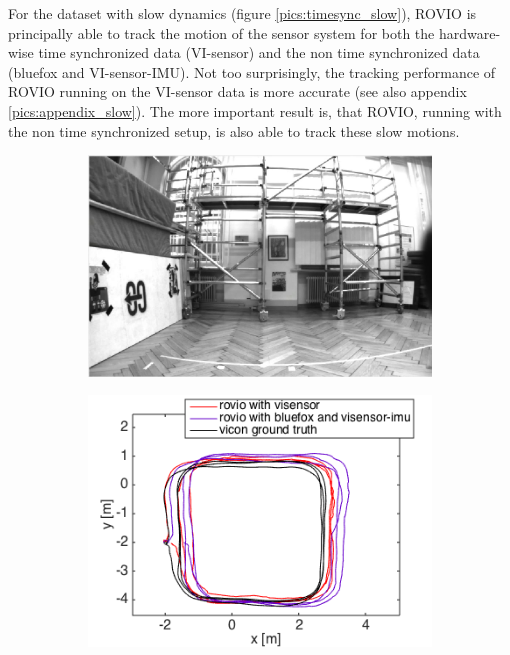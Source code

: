 For the dataset with slow dynamics (figure \ref{pics:timesync_slow}), ROVIO is principally able to track the motion of the sensor system for both the hardware-wise time synchronized data (VI-sensor) and the non time synchronized data (bluefox and VI-sensor-IMU). Not too surprisingly, the tracking performance of ROVIO running on the VI-sensor data is more accurate (see also appendix \ref{pics:appendix_slow}). The more important result is, that ROVIO, running with the non time synchronized setup, is also able to track these slow motions. \\

\begin{figure}
  \begin{subfigure}[b]{0.46\textwidth}
    \captionsetup{skip=6pt}
    \includegraphics[width=\textwidth]{images/slow.png}
    \caption{}
  \end{subfigure}
  \hfill
  \begin{subfigure}[b]{0.42\textwidth}
    \captionsetup{skip=6pt}
    \includegraphics[width=\textwidth]{images/slow_2D.png}

\end{subfigure}
\end{figure}
